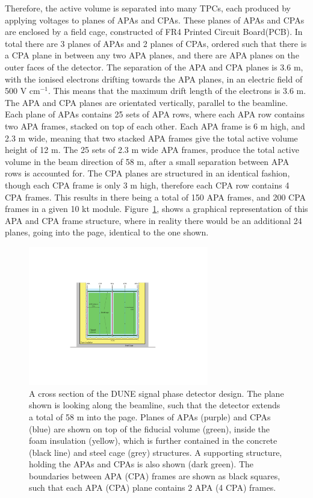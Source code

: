Therefore, the active volume is separated into many TPCs, each produced by applying voltages to planes of APAs and CPAs. These planes of APAs and CPAs are enclosed by a field cage, constructed of FR4 Printed Circuit Board(PCB). In total there are 3 planes of APAs and 2 planes of CPAs, ordered such that there is a CPA plane in between any two APA planes, and there are APA planes on the outer faces of the detector. The separation of the APA and CPA planes is 3.6 m, with the ionised electrons drifting towards the APA planes, in an electric field of 500 V cm$^{-1}$. This means that the maximum drift length of the electrons is 3.6 m. The APA and CPA planes are orientated vertically, parallel to the beamline. Each plane of APAs contains 25 sets of APA rows, where each APA row contains two APA frames, stacked on top of each other. Each APA frame is 6 m high, and 2.3 m wide, meaning that two stacked APA frames give the total active volume height of 12 m. The 25 sets of 2.3 m wide APA frames, produce the total active volume in the beam direction of 58 m, after a small separation between APA rows is accounted for. The CPA planes are structured in an identical fashion, though each CPA frame is only 3 m high, therefore each CPA row contains 4 CPA frames. This results in there being a total of 150 APA frames, and 200 CPA frames in a given 10 kt module. Figure~\ref{fig:DUNE_SP_Schem}, shows a graphical representation of this APA and CPA frame structure, where in reality there would be an additional 24 planes, going into the page, identical to the one shown. \\

\begin{figure}
  \centering
  \includegraphics[width=0.7\textwidth]{SinglePhase_CrossSec}
  \caption[A cross section of the DUNE single phase detector design]
          {A cross section of the DUNE signal phase detector design. The plane shown is looking along the beamline, such that the detector extends a total of 58 m into the page. Planes of APAs (purple) and CPAs (blue) are shown on top of the fiducial volume (green), inside the foam insulation (yellow), which is further contained in the concrete (black line) and steel cage (grey) structures. A supporting structure, holding the APAs and CPAs is also shown (dark green). The boundaries between APA (CPA) frames are shown as black squares, such that each APA (CPA) plane contains 2 APA (4 CPA) frames.}
  \label{fig:DUNE_SP_Schem}
\end{figure}

